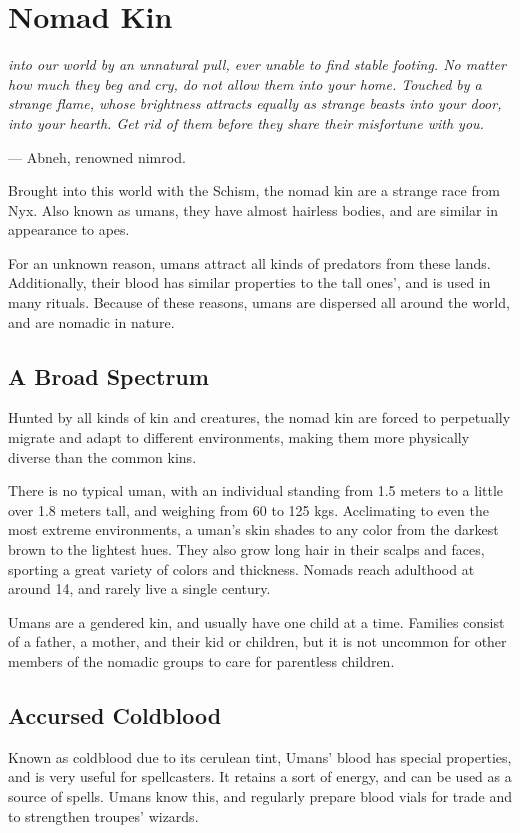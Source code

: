 \section{Nomad Kin} \label{sec::nomadkin}

\textit{into our world by an unnatural pull, ever unable to find stable footing.
No matter how much they beg and cry, do not allow them into your home.
Touched by a strange flame, whose brightness attracts equally as strange beasts into your door, into your hearth.
Get rid of them before they share their misfortune with you.}

\hspace*{\fill} --- Abneh, renowned nimrod.

Brought into this world with the Schism, the nomad kin are a strange race from Nyx.
Also known as umans, they have almost hairless bodies, and are similar in appearance to apes.

For an unknown reason, umans attract all kinds of predators from these lands.
Additionally, their blood has similar properties to the tall ones', and is used in many rituals.
Because of these reasons, umans are dispersed all around the world, and are nomadic in nature.

\subsection*{A Broad Spectrum}
Hunted by all kinds of kin and creatures, the nomad kin are forced to perpetually migrate and adapt to different environments, making them more physically diverse than the common kins.

There is no typical uman, with an individual standing from 1.5 meters to a little over 1.8 meters tall, and weighing from 60 to 125 kgs.
Acclimating to even the most extreme environments, a uman's skin shades to any color from the darkest brown to the lightest hues.
They also grow long hair in their scalps and faces, sporting a great variety of colors and thickness.
Nomads reach adulthood at around 14, and rarely live a single century.

Umans are a gendered kin, and usually have one child at a time.
Families consist of a father, a mother, and their kid or children, but it is not uncommon for other members of the nomadic groups to care for parentless children.

\subsection*{Accursed Coldblood}
Known as coldblood due to its cerulean tint, Umans' blood has special properties, and is very useful for spellcasters.
It retains a sort of energy, and can be used as a source of spells.
Umans know this, and regularly prepare blood vials for trade and to strengthen troupes' wizards.

